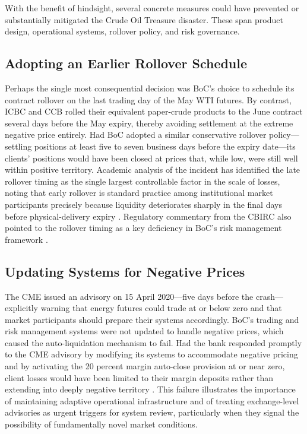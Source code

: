 \documentclass[a4paper,11pt]{article}
\begin{document}
With the benefit of hindsight, several concrete measures could have
prevented or substantially mitigated the Crude Oil Treasure disaster.
These span product design, operational systems, rollover policy, and
risk governance.

\subsection{Adopting an Earlier Rollover Schedule}

Perhaps the single most consequential decision was BoC's choice to
schedule its contract rollover on the last trading day of the May WTI
futures. By contrast, ICBC and CCB rolled their equivalent
paper-crude products to the June contract several days before the May
expiry, thereby avoiding settlement at the extreme negative price
entirely. Had BoC adopted a similar conservative rollover
policy---settling positions at least five to seven business days
before the expiry date---its clients' positions would have been
closed at prices that, while low, were still well within positive
territory. Academic analysis of the incident has identified the late
rollover timing as the single largest controllable factor in the
scale of losses, noting that early rollover is standard practice
among institutional market participants precisely because liquidity
deteriorates sharply in the final days before physical-delivery
expiry \cite{drpress2023icbc}. Regulatory commentary from the CBIRC
also pointed to the rollover timing as a key deficiency in BoC's risk
management framework \cite{caixin2020probe}.

\subsection{Updating Systems for Negative Prices}

The CME issued an advisory on 15 April 2020---five days before the
crash---explicitly warning that energy futures could trade at or
below zero and that market participants should prepare their systems
accordingly. BoC's trading and risk management systems were not
updated to handle negative prices, which caused the auto-liquidation
mechanism to fail. Had the bank responded promptly to the CME
advisory by modifying its systems to accommodate negative pricing and
by activating the 20 percent margin auto-close provision at or near
zero, client losses would have been limited to their margin deposits
rather than extending into deeply negative territory
\cite{cgtn2020fined}. This failure illustrates the importance of
maintaining adaptive operational infrastructure and of treating
exchange-level advisories as urgent triggers for system review,
particularly when they signal the possibility of fundamentally novel
market conditions.
\end{document}
